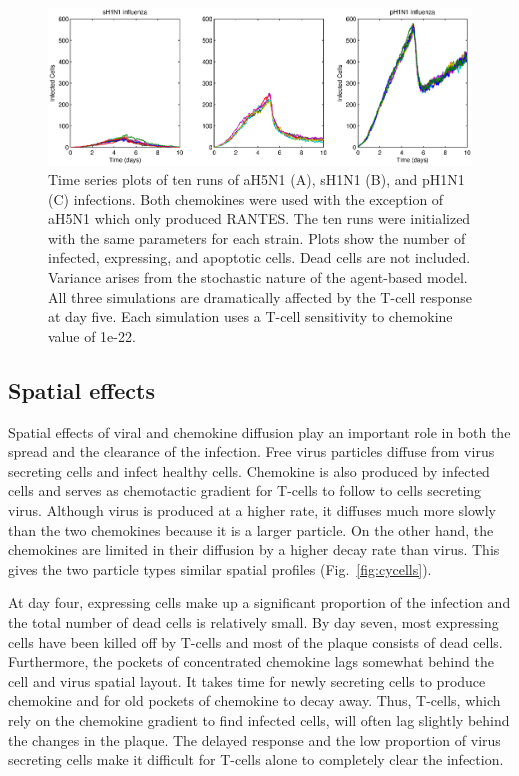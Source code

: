\documentclass[10pt]{article}
\begin{document}
\begin{figure}[ht!]
\begin{center}
 \includegraphics[width=\textwidth]{variance}
 \end{center}
\caption{Time series plots of ten runs of aH5N1 (A), sH1N1 (B), and pH1N1 (C) infections.  Both chemokines were used with the exception of aH5N1 which only produced RANTES.  The ten runs were initialized with the same parameters for each strain.  Plots show the number of infected, expressing, and apoptotic cells.  Dead cells are not included.  Variance arises from the stochastic nature of the agent-based model.  All three simulations are dramatically affected by the T-cell response at day five.  Each simulation uses a T-cell sensitivity to chemokine value of 1e-22.} 
 \label{fig:variance}
\end{figure}


\subsection*{Spatial effects}

Spatial effects of viral and chemokine diffusion play an important role in both the spread and the clearance of the infection.  Free virus particles diffuse from virus secreting cells and infect healthy cells.  Chemokine is also produced by infected cells and serves as chemotactic gradient for T-cells to follow to cells secreting virus.  Although virus is produced at a higher rate, it diffuses much more slowly than the two chemokines because it is a larger particle.  On the other hand, the chemokines are limited in their diffusion by a higher decay rate than virus.  This gives the two particle types similar spatial profiles (Fig.~\ref{fig:cycells}).

At day four, expressing cells make up a significant proportion of the infection and the total number of dead cells is relatively small.  By day seven, most expressing cells have been killed off by T-cells and most of the plaque consists of dead cells.  Furthermore, the pockets of concentrated chemokine lags somewhat behind the cell and virus spatial layout.  It takes time for newly secreting cells to produce chemokine and for old pockets of chemokine to decay away.  Thus, T-cells, which rely on the chemokine gradient to find infected cells, will often lag slightly behind the changes in the plaque.  The delayed response and the low proportion of virus secreting cells make it difficult for T-cells alone to completely clear the infection.
\end{document}
